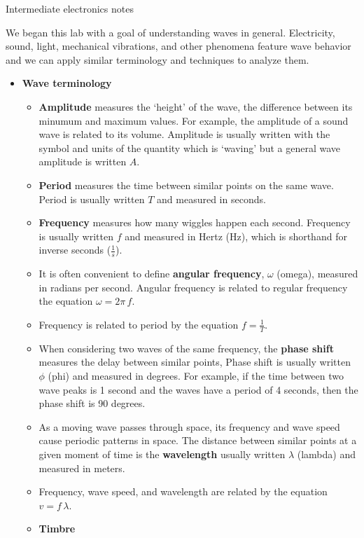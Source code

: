\documentclass{article}
\begin{document}
\begin{center}
  \Large{Intermediate electronics notes}
\end{center}
We began this lab with a goal of understanding waves in general.  Electricity, 
sound, light, mechanical vibrations, and other phenomena feature wave behavior 
and we can apply similar terminology and techniques to analyze them.
\begin{itemize}

\item \textbf{Wave terminology}
  \begin{itemize}
    \item \textbf{Amplitude} measures the `height' of the wave, the difference
          between its minumum and maximum values. For example, the amplitude 
          of a sound wave is related to its volume. Amplitude is usually 
          written with the symbol and units of the quantity which is `waving' 
          but a general wave amplitude is written $A$.
    \item \textbf{Period} measures the time between similar points on the same
          wave. Period is usually written $T$ and measured in seconds.
    \item \textbf{Frequency} measures how many wiggles happen each second.
          Frequency is usually written $f$ and measured in Hertz (Hz), which
          is shorthand for inverse seconds ($\frac{1}{s}$).
    \item It is often convenient to define \textbf{angular frequency}, $\omega$
          (omega), measured in radians per second. Angular frequency is
          related to regular frequency the equation $\omega = 2\pi\,f$.
    \item Frequency is related to period by the equation $f=\frac{1}{T}$. 
    \item When considering two waves of the same frequency, the 
          \textbf{phase shift} measures the delay between similar points,
          Phase shift is usually written $\phi$ (phi) and measured in degrees.
          For example, if the time between two wave peaks is 1 second and the 
          waves have a period of 4 seconds, then the phase shift is 90 degrees.
    \item As a moving wave passes through space, its frequency and wave speed
          cause periodic patterns in space. The distance between similar points
          at a given moment of time is the \textbf{wavelength} usually written
          $\lambda$ (lambda) and measured in meters.
    \item Frequency, wave speed, and wavelength are related by the equation
          $v = f\,\lambda$.
    \item \textbf{Timbre}
  \end{itemize}


\end{itemize}
\end{document}
